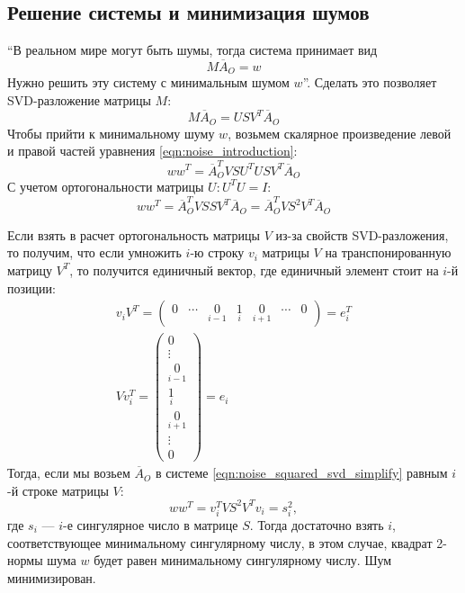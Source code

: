 \documentclass[12pt, a4paper]{article}
\begin{document}
\subsection{Решение системы и минимизация шумов}
``В реальном мире могут быть шумы, тогда система принимает вид 
\begin{equation}
M \overline{A}_{O} = w
\label{eqn:noise_introduction}
\end{equation}
Нужно решить эту систему с минимальным шумом $w$''\cite{dlt_temugeb}. Сделать это позволяет
SVD-разложение матрицы $M$:
\begin{equation}
    M \overline{A}_O = U S V^T \overline{A}_O
\label{eqn:dlt-two-cameras-matrix}
\end{equation}
Чтобы прийти к минимальному шуму $w$, возьмем скалярное произведение левой и правой частей уравнения \eqref{eqn:noise_introduction}:
\begin{equation}
    w w^T =   \overline{A}_O^T V S U^T U S V^T \overline{A}_O
\end{equation}
С учетом ортогональности матрицы $U: U^T U = I$:
\begin{equation}
    w w^T = \overline{A}_O^T V S S V^T \overline{A}_O = 
    \overline{A}_O^T V S^2 V^T \overline{A}_O
\label{eqn:noise_squared_svd_simplify}
\end{equation}
\par
Если взять в расчет ортогональность матрицы $V$ из-за свойств SVD-разложения,
то получим, что если умножить $i$-ю строку $v_i$ матрицы $V$ на
транспонированную матрицу $V^T$, то получится единичный вектор, где единичный
элемент стоит на $i$-й позиции:
\begin{equation}
\begin{gathered}
    v_i V^T = \begin{pmatrix}
        0 & \cdots & \underset{i-1}{0} & \underset{i}{1} & \underset{i+1}{0} & \cdots & 0
    \end{pmatrix} = e_i^T \\
    V v_i^T = \begin{pmatrix}
        0 \\
        \vdots \\
        \underset{i-1}{0}\\
        \underset{i}{1}\\
        \underset{i+1}{0}\\
        \vdots\\
        0
    \end{pmatrix} = e_i
\end{gathered}
\end{equation}
Тогда, если мы возьем $\overline{A}_O$ в системе \eqref{eqn:noise_squared_svd_simplify} равным $i$-й строке матрицы $V$:
\begin{equation}
    w w^T = v_i^T V S^2 V^T v_i = s_i^2,
\end{equation}
где $s_i$ --- $i$-е сингулярное число в матрице $S$. Тогда достаточно взять $i$,
соответствующее минимальному сингулярному числу, в этом случае, квадрат 2-нормы
шума $w$ будет равен минимальному сингулярному числу. Шум минимизирован.
\end{document}
